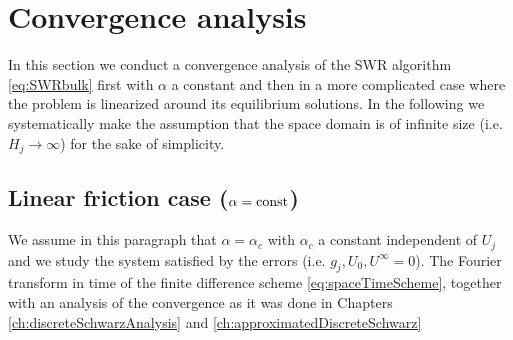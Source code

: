 \section{Convergence analysis} \label{sec:conv-lin}
In this section we conduct a convergence analysis of the SWR algorithm 
\eqref{eq:SWRbulk} first with $\alpha$ a constant and then in a more 
complicated case where the problem is linearized around its 
equilibrium solutions. In the following we systematically make the assumption 
that the space domain is of infinite size (i.e. $H_j\to\infty$)
for the sake of simplicity.
\subsection{Linear friction case ($\alpha = {\rm const}$)}
%
%
We assume in this paragraph that $\alpha=\alpha_{c}$ with $\alpha_{c}$ 
a constant independent of $U_j$ and we study the system satisfied by the errors
(i.e. $g_j, U_0, U^\infty =0$). 
The Fourier transform in time of the finite difference scheme
\eqref{eq:spaceTimeScheme}, together with an analysis
of the convergence as it was done in
Chapters \ref{ch:discreteSchwarzAnalysis} and
\ref{ch:approximatedDiscreteSchwarz}
